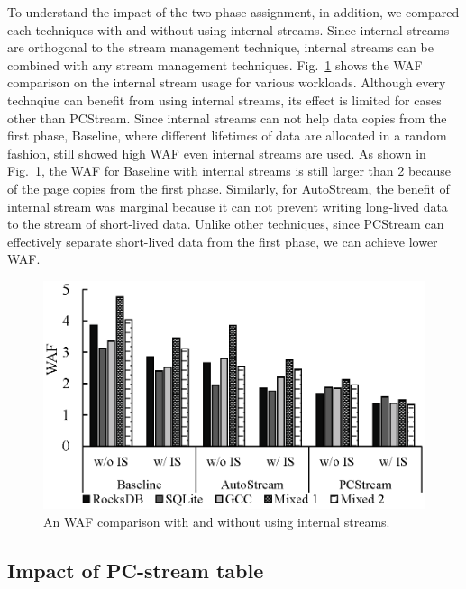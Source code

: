 To understand the impact of the
two-phase assignment, in addition, we compared each techniques
with and without using internal streams.
Since internal streams are orthogonal to the stream management technique,
internal streams can be combined with any stream management techniques.
Fig.~\ref{fig:internal} shows the WAF comparison on the internal stream usage 
for various workloads.
Although every technqiue can benefit from using internal streams,
its effect is limited for cases other than PCStream.
Since internal streams can not help data copies from the first phase,
Baseline, where different lifetimes of data 
are allocated in a random fashion, still showed high WAF even internal streams are used.
As shown in Fig.~\ref{fig:internal}, the WAF for Baseline with internal streams is still 
larger than 2 because of the page copies from the first phase.
Similarly, for AutoStream, the benefit of internal stream was marginal 
because it can not prevent writing long-lived data to the stream of short-lived data.
Unlike other techniques, since PCStream can effectively separate short-lived data
from the first phase, we can achieve lower WAF.


\begin{figure}[t]
	\centering
	\includegraphics[width=0.9\linewidth]{figure/internal}
	\caption{An WAF comparison with and without using internal streams.}
	\label{fig:internal}
\end{figure}


\subsection{Impact of PC-stream table}

